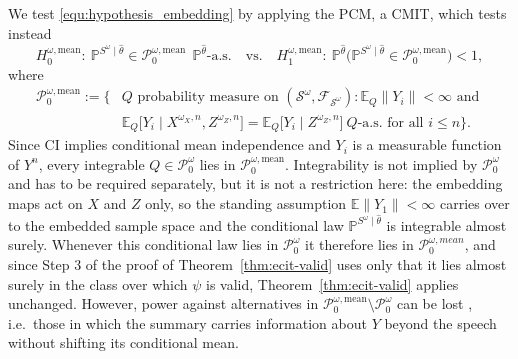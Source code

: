 \documentclass[twoside,11pt]{article}
\begin{document}
We test \eqref{equ:hypothesis_embedding} by applying the PCM, a CMIT, 
which tests instead
\begin{equation}\label{eq:mean-hyp}
  H_0^{\omega,\mathrm{mean}}:\
  \mathbb P^{S^\omega\mid\hat\theta}\in\mathcal P_0^{\omega,\mathrm{mean}}
  \ \ \mathbb P^{\hat\theta}\text{-a.s.}
  \quad\text{vs.}\quad
  H_1^{\omega,\mathrm{mean}}:\
  \mathbb {P}^{\hat\theta}\big(\mathbb P^{S^\omega\mid\hat\theta}
  \in\mathcal P_0^{\omega,\mathrm{mean}}\big)<1,
\end{equation}
where
\begin{align*}
  \mathcal P_0^{\omega,\mathrm{mean}}:=\Big\{&Q \text{ probability measure on } (\mathcal S^\omega,\mathcal F_{\mathcal S^\omega}) : \mathbb E_Q\|Y_i\|<\infty \text{ and }\\ 
  &\mathbb E_Q\big[Y_i\mid X^{\omega_X,n},Z^{\omega_Z,n}\big] =\mathbb E_Q\big[Y_i\mid Z^{\omega_Z,n}\big]\ Q\text{-a.s. for all } i\le n\Big\}.
\end{align*}
Since CI implies conditional mean independence and $Y_i$ is a measurable function of $Y^n$, every integrable $Q\in\mathcal P_0^\omega$ lies in $\mathcal P_0^{\omega,\mathrm{mean}}$. Integrability is not implied by $\mathcal{P}_0^{\omega}$ and has to be required separately, but it is not a restriction here: the embedding maps act on $X$ and $Z$ only, so the standing assumption $\mathbb{E}\|Y_1\|<\infty$ carries over to the embedded sample space and the conditional law $\mathbb{P}^{S^\omega\mid \hat\theta}$ is integrable almost surely. Whenever this conditional law lies in $\mathcal{P}_0^{\omega}$ it therefore lies in $\mathcal{P}_0^{\omega,mean}$, and since Step 3 of the proof of Theorem~\ref{thm:ecit-valid} uses only that it lies almost surely in the class over which $\psi$ is valid, Theorem~\ref{thm:ecit-valid} applies unchanged.
However, power against alternatives in $\mathcal P_0^{\omega,\mathrm{mean}}\setminus\mathcal P_0^\omega$ can be lost \citep{lundborg2024projected}, i.e.\ those in which the summary carries information about $Y$ beyond the speech without shifting its conditional mean.
\end{document}
